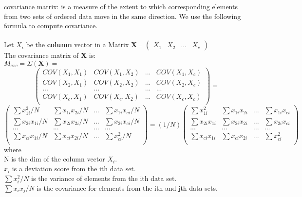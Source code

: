 \begin{compactitem}
\item {covariance matrix:}
is a measure of the extent to which corresponding elements from two sets
of ordered data move in the same direction. We use the following formula to compute covariance.
\cite{wiki-covariance}\cite{STAT-covariance}\\
\\Let $X_i$ be the \textbf{column} vector in a Matrix \textbf{X}=
$\begin{pmatrix} X_1 & X_2 &... & X_c \end{pmatrix}$\\
The covariance matrix of \textbf{X} is:\\
$M_{cxc} = \Sigma{(\textbf{X})}=$
\[
\begin{pmatrix}
       COV(X_1,X_1) 	& COV(X_1,X_2) 	& ...	& COV(X_1,X_c)	\\[0.3em]
       COV(X_2,X_1) 	& COV(X_2,X_2) 	& ...	& COV(X_2,X_c)	\\[0.3em]
       ...		& ...			& ...	&	...		\\[0.3em]
       COV(X_c,X_1) 	& COV(X_c,X_2) 	& ...	& COV(X_c,X_c)	\\[0.3em]
\end{pmatrix}
=\]
\begin{equation}
\label{eq:covarm1}
\begin{pmatrix}
       \sum x_{1i}^{2}/N 	& \sum x_{1i} x_{2i}/N 	& ...	& \sum x_{1i} x_{ci}/N	\\[0.3em]
       \sum x_{2i} x_{1i}/N 	& \sum x_{2i} x_{2i}/N 	& ...	& \sum x_{2i} x_{ci}/N	\\[0.3em]
       ...		& ...			& ...	&	...		\\[0.3em]
       \sum x_{ci} x_{1i}/N 	& \sum x_{ci} x_{2i}/N 	& ...	& \sum x_{ci}^{2}/N	\\[0.3em]
\end{pmatrix}
=(1/N)
\begin{pmatrix}
       \sum x_{1i}^{2} 	& \sum x_{1i} x_{2i} 	& ...	& \sum x_{1i} x_{ci}	\\[0.3em]
       \sum x_{2i} x_{1i} 	& \sum x_{2i} x_{2i} 	& ...	& \sum x_{2i} x_{ci}	\\[0.3em]
       ...		& ...			& ...	&	...		\\[0.3em]
       \sum x_{ci} x_{1i} 	& \sum x_{ci} x_{2i} 	& ...	& \sum x_{ci}^{2}	\\[0.3em]
\end{pmatrix}
\end{equation}
where\\
N is the dim of the column vector $X_i$.\\
$x_i$ is a deviation score from the ith data set.\\
$\sum x_i^2 / N$ is the variance of elements from the ith data set.\\
$\sum x_i x_j / N$ is the covariance for elements from the ith and jth data sets.\\


\end{compactitem}
